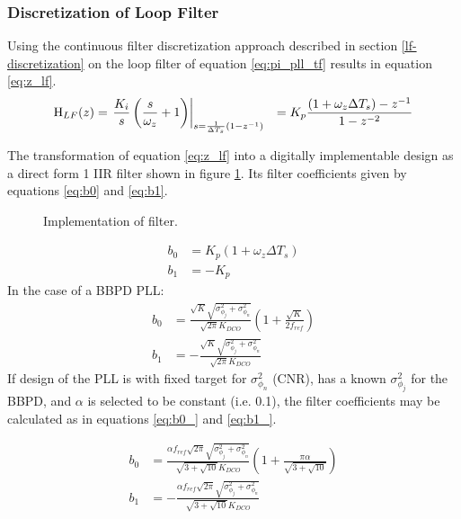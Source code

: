 	\subsubsection{Discretization of Loop Filter}\label{disc_lf_comp_pi}
		Using the continuous filter discretization approach described in section \ref{lf-discretization} on the loop filter of equation \ref{eq:pi_pll_tf} results in equation \ref{eq:z_lf}.
		\begin{align}
			\textnormal{H}_{LF}(z) & = \left.\frac{K_i}{s}\left(\frac{s}{\omega_z} + 1\right)\right\vert_{s=\frac{1}{\Delta T_s}(1-z^{-1})}
			&= K_p\frac{(1+\omega_z\Delta T_s)-z^{-1}}{1- z^{-2}}\label{eq:z_lf}
		\end{align}

		The transformation of equation \ref{eq:z_lf} into a digitally implementable design as a direct form 1 IIR filter shown in figure \ref{fig:filt_imple}. Its filter coefficients given by equations \ref{eq:b0} and \ref{eq:b1}.
		\begin{figure}[htb!]
			\center
			\caption{Implementation of filter.}
			\label{fig:filt_imple}
		\end{figure}
		\begin{align}
			b_0 &= K_p (1+\omega_z\Delta T_s)\\
			 b_1 &= -K_p 
		\end{align}
		In the case of a BBPD PLL:
		\begin{align}
			b_0 &= \frac{\sqrt{K}\sqrt{\sigma^2_{\phi_j} + \sigma^2_{\phi_n}}}{\sqrt{2\pi}K_{DCO}}\left(1+\frac{\sqrt{K}}{2f_{ref}}\right)\label{eq:b0}\\
			 b_1 &=  - \frac{\sqrt{K}\sqrt{\sigma^2_{\phi_j} + \sigma^2_{\phi_n}}}{\sqrt{2\pi}K_{DCO}}\label{eq:b1}
		\end{align}
		If design of the PLL is with fixed target for $\sigma^2_{\phi_n}$ (CNR), has a known $\sigma^2_{\phi_j}$ for the BBPD, and $\alpha$ is selected to be constant (i.e. 0.1), the filter coefficients may be calculated as in equations \ref{eq:b0_} and \ref{eq:b1_}.

		\begin{align}
			b_0 &= \frac{\alpha f_{ref}\sqrt{2\pi}\sqrt{\sigma^2_{\phi_j} + \sigma^2_{\phi_n}}}{\sqrt{3+\sqrt{10}}K_{DCO}} \left(1+\frac{\pi\alpha}{\sqrt{3+\sqrt{10}}}\right)\label{eq:b0_}\\
			 b_1 &= - \frac{\alpha f_{ref}\sqrt{2\pi}\sqrt{\sigma^2_{\phi_j} + \sigma^2_{\phi_n}}}{\sqrt{3+\sqrt{10}}K_{DCO}}\label{eq:b1_}
		\end{align}




